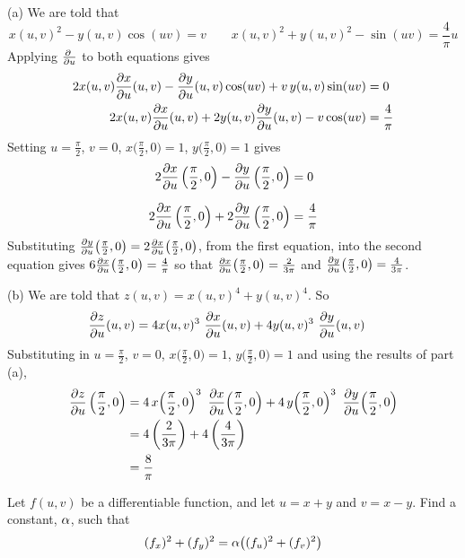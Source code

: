 \begin{solution}
(a) We are told that
\begin{equation*}
x(u,v)^2-y(u,v)\cos(uv)=v\qquad
x(u,v)^2+y(u,v)^2-\sin(uv)=\frac{4}{\pi}u
\end{equation*}
Applying $\pdiff{}{u}$ to both equations gives
\begin{align*}
2x(u,v)\pdiff{x}{u}(u,v)
-\pdiff{y}{u}(u,v)\cos(uv)+v\,y(u,v)\sin(uv)&=0 \\
2x(u,v)\pdiff{x}{u}(u,v)
   +2y(u,v)\pdiff{y}{u}(u,v)
   -v\cos(uv)&=\frac{4}{\pi}
\end{align*}
Setting $u=\frac{\pi}{2}$, $v=0$, $x\big(\frac{\pi}{2},0\big)=1$, 
$y\big(\frac{\pi}{2},0\big)=1$ gives
\begin{align*}
2\pdiff{x}{u}\left(\frac{\pi}{2},0\right)
-\pdiff{y}{u}\left(\frac{\pi}{2},0\right)&=0 \\[0.1in]
2\pdiff{x}{u}\left(\frac{\pi}{2},0\right)
   +2\pdiff{y}{u}\left(\frac{\pi}{2},0\right)
   &=\frac{4}{\pi}
\end{align*}
Substituting $\pdiff{y}{u}\big(\frac{\pi}{2},0\big)=2\pdiff{x}{u}\big(\frac{\pi}{2},0\big)$, 
from the first equation, into the second equation gives 
$6\pdiff{x}{u}\big(\frac{\pi}{2},0\big)=\frac{4}{\pi}$
so that
  $\pdiff{x}{u}\big(\frac{\pi}{2},0\big)=\frac{2}{3\pi}$ and
$\pdiff{y}{u}\big(\frac{\pi}{2},0\big)=\frac{4}{3\pi}$.

(b) 
We are told that $z(u,v)=x(u,v)^4+y(u,v)^4$. So
\begin{align*}
\pdiff{z}{u}(u,v)
&=4x(u,v)^3\ \pdiff{x}{u}(u,v)
+4y(u,v)^3\ \pdiff{y}{u}(u,v) 
\end{align*}
Substituting in $u=\frac{\pi}{2}$, $v=0$, $x\big(\frac{\pi}{2},0\big)=1$, 
$y\big(\frac{\pi}{2},0\big)=1$ and using the results of part (a),
\begin{align*}
\pdiff{z}{u}\left(\frac{\pi}{2},0\right)
&=4\,x\!\left(\frac{\pi}{2},0\right)^3\ 
       \pdiff{x}{u}\!\left(\frac{\pi}{2},0\right)
+4\,y\!\left(\frac{\pi}{2},0\right)^3\ 
       \pdiff{y}{u}\!\left(\frac{\pi}{2},0\right) \\
&=4\left(\frac{2}{3\pi}\right)
+4\left(\frac{4}{3\pi}\right) \\
&=\frac{8}{\pi}
\end{align*}
\end{solution}

\begin{question} [M200 2001A] %
Let $f(u,v)$ be a differentiable function, and let $u=x+y$
and $v=x-y$. Find a constant, $\alpha$, such that
\begin{align*}
(f_x)^2+(f_y)^2=\alpha\big((f_u)^2+(f_v)^2\big)
\end{align*}
\end{question}


